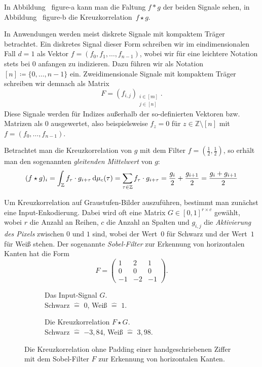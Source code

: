 \documentclass[paper=a4, 	%
		fontsize=11pt, 		%
		abstracton, 	%
		headsepline, 	%
		notitlepage	%
		]{scrartcl}
\theoremstyle{definition}
\newcommand{\Z}{\mathbb{Z}}
\newcommand{\diff}{\,\textrm{d}}
\newcommand{\todo}[1]{{\color{red} #1}}
\newcommand{\fNat}[1]{[ #1 ]}
\begin{document}
In Abbildung~\todo{figure-a} kann man die Faltung $f * g$ der beiden Signale sehen, in Abbildung~\todo{figure-b} die Kreuzkorrelation~$f\star g$.


In Anwendungen werden meist diskrete Signale mit kompaktem Träger betrachtet.
Ein diskretes Signal dieser Form schreiben wir im eindimensionalen Fall $d=1$ als Vektor $f = (f_0, f_1, \dots, f_{n-1})$, wobei wir für eine leichtere Notation stets bei $0$ anfangen zu indizieren.
Dazu führen wir als Notation $\fNat{n}\coloneqq \{0, \dots, n-1\}$ ein. 
Zweidimensionale Signale mit kompaktem Träger schreiben wir demnach als Matrix $$F = (f_{i,j})_{\substack{i\in\fNat{m}\\ j\in\fNat{n}}}.$$
Diese Signale werden für Indizes außerhalb der so-definierten Vektoren bzw. Matrizen als $0$ ausgewertet, also beispielsweise $f_z = 0$ für $z\in\Z\setminus\fNat{n}$ mit $f=(f_0, \dots, f_{n-1})$.

Betrachtet man die Kreuzkorrelation von $g$ mit dem Filter $f=(\frac{1}{2}, \frac{1}{2})$, so erhält man den sogenannten \emph{gleitenden Mittelwert} von $g$:
\[  
    (f \star g)_i = \int_\Z f_\tau \cdot g_{i + \tau} \diff \cmeasure(\tau) 
    = \sum_{\tau\in\Z} f_\tau \cdot g_{i+ \tau}
    = \frac{g_i}{2} + \frac{g_{i+1}}{2} = \frac{g_i + g_{i+1}}{2}
\]

Um Kreuzkorrelation auf Graustufen-Bilder auszuführen, bestimmt man zu\-nächst eine Input-Enkodierung.
Dabei wird oft eine Matrix $G\in[0,1]^{r\times c}$ gewählt, wobei $r$ die Anzahl an Reihen, $c$ die Anzahl an Spalten und $g_{i,j}$ die \emph{Aktivierung des Pixels} zwischen $0$ und $1$ sind, wobei der Wert~$0$ für Schwarz und der Wert~$1$ für Weiß stehen.
Der sogenannte \emph{Sobel-Filter} zur Erkennung von horizontalen Kanten hat die Form
\[
    F = \begin{pmatrix}
        1 & 2 & 1 \\
        0 & 0 & 0 \\ 
        -1 & -2 & -1
    \end{pmatrix}.
\]


\begin{figure}
    \centering
    \begin{subfigure}{0.4\textwidth}
        \resizebox{\textwidth}{\textwidth}{
        
        }
        \caption{Das Input-Signal $G$.\\Schwarz $\hat=$ $0$, Weiß $\hat=$ $1$.}
    \end{subfigure}%
    \begin{subfigure}{0.4\textwidth}
        \resizebox{0.9285\textwidth}{0.9285\textwidth}{
        
        }
    \caption{Die Kreuzkorrelation $F\star G$.\\Schwarz $\hat=$ $-3{,}84$, Weiß $\hat=$ $3{,}98$.}
    \end{subfigure}
    \caption{Die Kreuzkorrelation ohne Padding einer handgeschriebenen Ziffer mit dem Sobel-Filter $F$ zur Erkennung von horizontalen Kanten.}
    \label{fig:sobel-on-mnist}
\end{figure}
\end{document}
